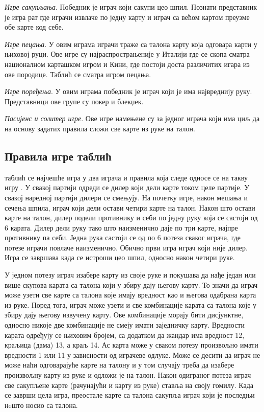 \documentclass[a4paper, 12pt, ngerman]{article}
\let\oldsubsection\subsection
\renewcommand\subsection{\clearpage\oldsubsection}
\begin{document}
\textit{Игре сакупљања}. Победник је играч који сакупи цео шпил. Познати представник је игра рат где играчи извлаче по једну карту и играч са већом картом преузме обе карте код себе. 

\textit{Игре пецања}. У овим играма играчи траже са талона карту која одговара карти у њиховој руци. Ове игре су најраспрострањеније у Италији где се скопа сматра националном карташком игром и Кини, где постоји доста различитих игара из ове породице. Таблић се сматра игром пецања.

\textit{Игре поређења}. У овим играма победник је играч који је има највреднију руку. Представници ове групе су покер и блекџек.

\textit{Пасијенс и солитер игре}. Ове игре намењене су за једног играча који има циљ да на основу задатих правила сложи све карте из руке на талон.


\subsection{Правила игре таблић}
таблић се најчешће игра у два играча и правила која следе односе се на такву игру \cite{tablicpravila}. У свакој партији одреди се дилер који дели карте током целе партије. У свакој наредној партији дилери се смењују. На почетку игре, након мешања и сечења шпила, играч који дели остави четири карте на талон. Након што остави карте на талон, дилер подели противнику и себи по једну руку која се састоји од 6 карата. Дилер дели руку тако што наизменично даје по три карте, најпре противнику па себи. Једна рука састоји се од по 6 потеза сваког играча, где потезе играчи повлаче наизменично. Обично први игра играч који није дилер. Игра се завршава када се истроши цео шпил, односно након четири руке.

У једном потезу играч изабере карту из своје руке и покушава да нађе један или више скупова карата са талона који у збиру дају његову карту. То значи да играч може узети све карте са талона које имају вредност као и његова одабрана карта из руке. Поред тога, играч може узети и све комбинације карата са талона које у збиру дају његову извучену карту. Ове комбинације морају бити дисјунктне, односно никоје две комбинације не смеју имати заједничку карту. Вредности карата одређују се њиховим бројем, са додатком да жандар има вредност 12, краљица (дама) 13, а краљ 14. Ас карта може у сваком потезу произвољно имати вредности 1 или 11 у зависности од играчеве одлуке. Може се десити да играч не може наћи одговарајуће карте на талону и у том случају треба да изабере произвољну карту из руке и одложи је на талон. Након одиграног потеза играч све сакупљене карте (рачунајући и карту из руке) ставља на своју гомилу. Када се заврши цела игра, преостале карте са талона сакупља играч који је последњи нeшто носио са талона.
\end{document}
